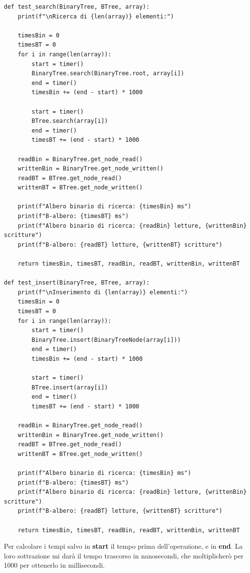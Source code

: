 \begin{verbatim}
def test_search(BinaryTree, BTree, array):
    print(f"\nRicerca di {len(array)} elementi:")

    timesBin = 0
    timesBT = 0
    for i in range(len(array)):
        start = timer()
        BinaryTree.search(BinaryTree.root, array[i])
        end = timer()
        timesBin += (end - start) * 1000

        start = timer()
        BTree.search(array[i])
        end = timer()
        timesBT += (end - start) * 1000

    readBin = BinaryTree.get_node_read()
    writtenBin = BinaryTree.get_node_written()
    readBT = BTree.get_node_read()
    writtenBT = BTree.get_node_written()

    print(f"Albero binario di ricerca: {timesBin} ms")
    print(f"B-albero: {timesBT} ms")
    print(f"Albero binario di ricerca: {readBin} letture, {writtenBin} scritture")
    print(f"B-albero: {readBT} letture, {writtenBT} scritture")

    return timesBin, timesBT, readBin, readBT, writtenBin, writtenBT

def test_insert(BinaryTree, BTree, array):
    print(f"\nInserimento di {len(array)} elementi:")
    timesBin = 0
    timesBT = 0
    for i in range(len(array)):
        start = timer()
        BinaryTree.insert(BinaryTreeNode(array[i]))
        end = timer()
        timesBin += (end - start) * 1000

        start = timer()
        BTree.insert(array[i])
        end = timer()
        timesBT += (end - start) * 1000

    readBin = BinaryTree.get_node_read()
    writtenBin = BinaryTree.get_node_written()
    readBT = BTree.get_node_read()
    writtenBT = BTree.get_node_written()

    print(f"Albero binario di ricerca: {timesBin} ms")
    print(f"B-albero: {timesBT} ms")
    print(f"Albero binario di ricerca: {readBin} letture, {writtenBin} scritture")
    print(f"B-albero: {readBT} letture, {writtenBT} scritture")

    return timesBin, timesBT, readBin, readBT, writtenBin, writtenBT
\end{verbatim}

Per calcolare i tempi salvo in \textbf{start} il tempo prima dell'operazione, e in \textbf{end}. La loro sottrazione mi darà il tempo trascorso in nanosecondi, che moltiplicherò per 1000 per ottenerlo in millisecondi.     

